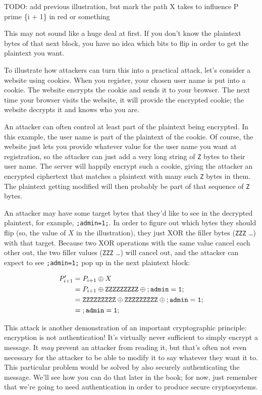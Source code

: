 \documentclass[11pt,ebook,table,dvipsnames]{memoir}
\begin{document}
TODO: add previous illustration, but mark the path X takes to
influence P prime \{i + 1\} in red or something

This may not sound like a huge deal at first. If you don't know the
plaintext bytes of that next block, you have no idea which bits to
flip in order to get the plaintext you want.

To illustrate how attackers can turn this into a practical attack,
let's consider a website using cookies. When you register, your chosen
user name is put into a cookie. The website encrypts the cookie and
sends it to your browser. The next time your browser visits the
website, it will provide the encrypted cookie; the website decrypts it
and knows who you are.

An attacker can often control at least part of the plaintext being
encrypted. In this example, the user name is part of the plaintext of
the cookie. Of course, the website just lets you provide whatever
value for the user name you want at registration, so the attacker can
just add a very long string of \verb~Z~ bytes to their user name. The
server will happily encrypt such a cookie, giving the attacker an
encrypted ciphertext that matches a plaintext with many such \verb~Z~ bytes in
them. The plaintext getting modified will then probably be part of
that sequence of \verb~Z~ bytes.

An attacker may have some target bytes that they'd like to see in the
decrypted plaintext, for example, \verb*|;admin=1;|. In order to
figure out which bytes they should flip (so, the value of $X$ in the
illustration), they just XOR the filler bytes (\verb~ZZZ~ \ldots) with that
target. Because two XOR operations with the same value cancel each
other out, the two filler values (\verb~ZZZ~ \ldots) will cancel out, and
the attacker can expect to see \verb|;admin=1;| pop up in the next
plaintext block:

\begin{align*}
P^{\prime}_{i + 1}
& = P_{i + 1} \oplus X \\
& = P_{i + 1}
  \oplus \mathtt{ZZZZZZZZZ}
  \oplus \mathtt{;admin=1;} \\
& = \mathtt{ZZZZZZZZZ}
  \oplus \mathtt{ZZZZZZZZZ}
  \oplus \mathtt{;admin=1;} \\
& = \mathtt{;admin=1;} \\
\end{align*}

This attack is another demonstration of an important cryptographic
principle: encryption is not authentication! It's virtually never
sufficient to simply encrypt a message. It \emph{may} prevent an attacker
from reading it, but that's often not even necessary for the attacker
to be able to modify it to say whatever they want it to. This
particular problem would be solved by also securely authenticating the
message. We'll see how you can do that later in the book; for now,
just remember that we're going to need authentication in order to
produce secure cryptosystems.
\end{document}
